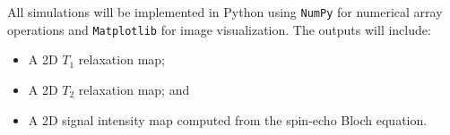 \documentclass[10pt,a4paper,twoside]{article}
\begin{document}
All simulations will be implemented in Python using \texttt{NumPy} for numerical array operations and \texttt{Matplotlib} for image visualization. The outputs will include:
\begin{itemize}
    \item A 2D \(T_1\) relaxation map;
    \item A 2D \(T_2\) relaxation map; and
    \item A 2D signal intensity map computed from the spin-echo Bloch equation.
\end{itemize}








\end{document}
